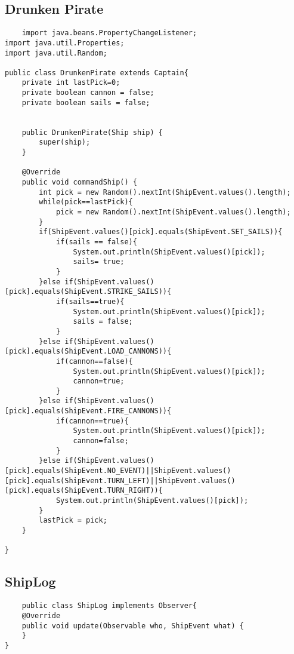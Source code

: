 \documentclass[12pt,a4paper,oneside,ngerman]{article}
\begin{document}
\subsection*{Drunken Pirate}
\begin{lstlisting}
	import java.beans.PropertyChangeListener;
import java.util.Properties;
import java.util.Random;

public class DrunkenPirate extends Captain{
    private int lastPick=0;
    private boolean cannon = false;
    private boolean sails = false;


    public DrunkenPirate(Ship ship) {
        super(ship);
    }

    @Override
    public void commandShip() {
        int pick = new Random().nextInt(ShipEvent.values().length);
        while(pick==lastPick){
            pick = new Random().nextInt(ShipEvent.values().length);
        }
        if(ShipEvent.values()[pick].equals(ShipEvent.SET_SAILS)){
            if(sails == false){
                System.out.println(ShipEvent.values()[pick]);
                sails= true;
            }
        }else if(ShipEvent.values()[pick].equals(ShipEvent.STRIKE_SAILS)){
            if(sails==true){
                System.out.println(ShipEvent.values()[pick]);
                sails = false;
            }
        }else if(ShipEvent.values()[pick].equals(ShipEvent.LOAD_CANNONS)){
            if(cannon==false){
                System.out.println(ShipEvent.values()[pick]);
                cannon=true;
            }
        }else if(ShipEvent.values()[pick].equals(ShipEvent.FIRE_CANNONS)){
            if(cannon==true){
                System.out.println(ShipEvent.values()[pick]);
                cannon=false;
            }
        }else if(ShipEvent.values()[pick].equals(ShipEvent.NO_EVENT)||ShipEvent.values()[pick].equals(ShipEvent.TURN_LEFT)||ShipEvent.values()[pick].equals(ShipEvent.TURN_RIGHT)){
            System.out.println(ShipEvent.values()[pick]);
        }
        lastPick = pick;
    }

}
\end{lstlisting}
\subsection*{ShipLog}
\begin{lstlisting}
	public class ShipLog implements Observer{
    @Override
    public void update(Observable who, ShipEvent what) {
    }
}
\end{lstlisting}
\end{document}
